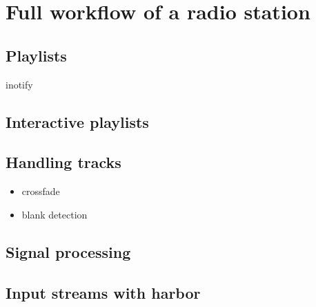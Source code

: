 \chapter{Full workflow of a radio station}
\section{Playlists}

inotify

\section{Interactive playlists}

\section{Handling tracks}
\begin{itemize}
\item crossfade
\item blank detection
\end{itemize}

\section{Signal processing}

\section{Input streams with harbor}
